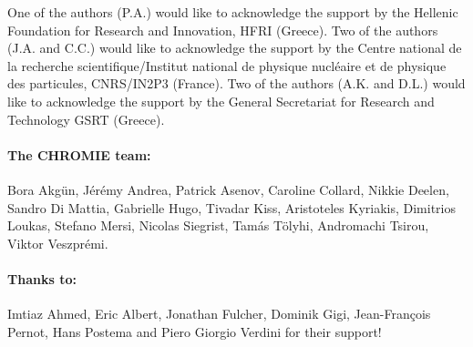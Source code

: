 \documentclass[a4paper,11pt]{article}
\begin{document}
\acknowledgments
One of the authors (P.A.) would like to acknowledge the support by the Hellenic Foundation for  Research and Innovation, HFRI (Greece). Two of the authors (J.A. and C.C.) would like to acknowledge the support by the Centre national de la recherche scientifique/Institut national de physique nucl\'eaire et de physique des particules, CNRS/IN2P3 (France). Two of the authors (A.K. and D.L.) would like to acknowledge the support by the General Secretariat for Research and Technology GSRT (Greece).

\paragraph{The CHROMIE team:} Bora Akg\"un, 
J\'er\'emy Andrea, Patrick Asenov, Caroline Collard, Nikkie Deelen, Sandro Di
Mattia, Gabrielle Hugo, Tivadar Kiss, Aristoteles
Kyriakis, Dimitrios Loukas, Stefano Mersi, Nicolas
Siegrist, Tam\'as T\"olyhi, Andromachi Tsirou, Viktor
Veszpr\'emi.	
\paragraph{Thanks to:} Imtiaz Ahmed, Eric Albert, Jonathan
Fulcher, Dominik Gigi, Jean-Fran\c{c}ois Pernot,
Hans Postema and Piero Giorgio Verdini for their
support!
\end{document}
